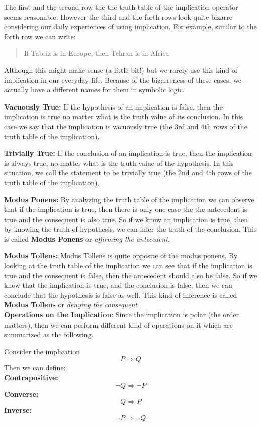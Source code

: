 The first and the second row the the truth table of the implication operator seems reasonable. However the third and the forth rows look quite bizarre considering our daily experiences of using implication. For example, similar to the forth row we can write:
\begin{quote}
	If Tabriz is in Europe, then Tehran is in Africa
\end{quote}
Although this might make sense (a little bit!) but we rarely use this kind of implication in our everyday life. Because of the bizarreness of these cases, we actually have a different names for them in symbolic logic.

\textbf{Vacuously True:} If the hypothesis of an implication is false, then the implication is true no matter what is the truth value of its conclusion. In this case we say that the implication is vacuously true (the 3rd and 4th rows of the truth table of the implication). 

\textbf{Trivially True:} If the conclusion of an implication is true, then the implication is always true, no matter what is the truth value of the hypothesis. In this situation, we call the statement to be trivially true (the 2nd and 4th rows of the truth table of the implication).


\textbf{Modus Ponens:} By analyzing the truth table of the implication we can observe that if the implication is true, then there is only one case the the antecedent is true and the consequent is also true. So if we know an implication is true, then by knowing the truth of hypothesis, we can infer the truth of the conclusion. This is called \textbf{Modus Ponens} or \emph{affirming the antecedent}.

\textbf{Modus Tollens:} Modus Tollens is quite opposite of the modus ponens. By looking at the truth table of the implication we can see that if the implication is true and the consequent is false, then the antecedent should also be false. So if we know that the implication is true, and the conclusion is false, then we can conclude that the hypothesis is false as well. This kind of inference is called \textbf{Modus Tollens} or \emph{denying the consequent} \\

\textbf{Operations on the Implication}: Since the implication is polar (the order matters), then we can perform different kind of operations on it which are summarized as the following.

\begin{defbox}{}
	Consider the implication
	\[  P \Rightarrow Q  \]
	Then we can define:\\
	
	\textbf{Contrapositive:}
	\[  \neg Q \Rightarrow \neg P  \]
	\textbf{Converse:}
	\[  Q \Rightarrow P  \] 
	\textbf{Inverse:}
	\[ \neg P \Rightarrow \neg Q \]
\end{defbox}

